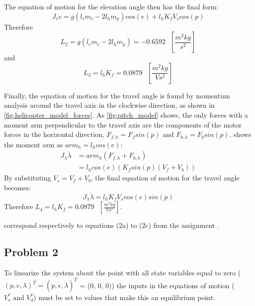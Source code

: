 The equation of motion for the elevation angle then has the final form:
\begin{equation}
  \label{eq:elevation EoM}
  J_e\ddot{e} = g(l_cm_c - 2l_hm_p)cos(e) + l_hK_fV_scos(p)
\end{equation}
%
Therefore 
\begin{equation*}
L_2 = g(l_cm_c-2l_hm_p) = -0.6592 \text{ } [\frac{m^2kg}{s^2}]
\end{equation*}
and
\begin{equation*}
L_3 = l_{h}K_{f} = 0.0879 \text{ } [\frac{m^2kg}{Vs^2}]
\end{equation*}

Finally, the equation of motion for the travel angle is found by
momentum analysis around the travel axis in the  clockwise direction, as
shown in \cref{fig:helicopter_model_forces}. As \cref{fig:pitch_model} shows, the only forces with a moment arm
perpendicular to the travel axis are the components of the motor
forces in the horizontal direction, $F_{f,h} = F_fsin(p)$ and $F_{b,h}
= F_bsin(p)$.  shows the moment arm as $arm_h = l_hcos(e)$:
%
\begin{align*}
  J_\lambda\ddot{\lambda} &= arm_h(F_{f,h} + F_{b,h}) \\
                         &= l_hcos(e)(K_fsin(p)(V_f + V_b))
\end{align*}
%
By substituting $V_s = V_f + V_b$, the final equation of
motion for the travel angle becomes:
%
\begin{equation}
  \label{eq:travel EoM}
  J_\lambda\ddot{\lambda} = l_hK_fV_scos(e)sin(p)
\end{equation}
%
Therefore $L_4 = l_hK_f = 0.0879 \text{ } [\frac{m^2kg}{Vs^2}]$.

  correspond respectively to equations
(2a) to (2c) from the assignment \cite[p.13]{assignment}.
%
\subsection{Problem 2}
To linearize the system about the point with all state variables equal
to zero ($(p, e, \lambda)^T = (\dot{p},\dot{e},\dot{\lambda})^T $ = (0, 0, 0))
the inputs in the equations of motion ($V^{*}_{s} \text{ and }
V^{*}_{d}$) must be set to values that make this an equilibrium point.

